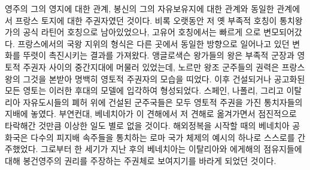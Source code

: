 영주의 그의 영지에 대한 관계, 봉신의 그의 자유보유지에 대한 관계와
동일한 관계에서 프랑스 토지에 대한 주권자였던 것이다.
비록 오랫동안 저 옛 부족적 호칭이 통치왕가의 공식 라틴어 호칭으로 남아있었으나,
고유어 호칭에서는 빠르게 으로 변모되어갔다.
프랑스에서의 국왕 지위의 형식은 다른 곳에서 동일한 방향으로 일어나고 있던
변화를 뚜렷이 촉진시키는 결과를 가져왔다.
앵글로색슨 왕가들의 왕은 부족적 군장과 영토적 주권자 사이의
중간지대에 머물러 있었는데,
노르만 왕조 군주들의 권력은 프랑스 왕의 그것을 본받아 명백히
영토적 주권자의 모습을 띠었다.
이후 건설되거나 공고화된 모든 영토는 이러한 후대의 모델에 입각하여 형성되었다.
스페인, 나폴리, 그리고 이탈리아 자유도시들의 폐허 위에 건설된
군주국들은 모두 영토적 주권을 가진 통치자들의 지배에 놓였다.
부연컨대, 베네치아가 이 견해에서 저 견해로 옮겨가면서 점진적으로
타락해간 것만큼 이상한 일도 별로 없을 것이다.
해외정복을 시작할 때의 베네치아 공화국은
다수의 피지배 속주들을 통치하는
로마 국가 체제의 예시의 하나로
스스로를
간주했었다.
그로부터 한 세기가 지난 후의 베네치아는
이탈리아와 에게해의 점유지들에 대해
봉건영주의 권리를 주장하는 주권체로 보여지기를
바라게 되었던 것이다.

